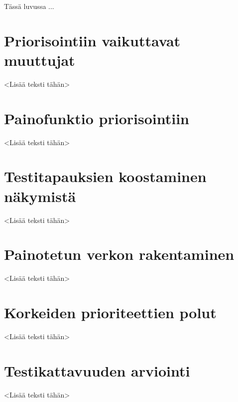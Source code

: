 Tässä luvussa ...

\section{Priorisointiin vaikuttavat muuttujat}

<Lisää teksti tähän>

\section{Painofunktio priorisointiin}

<Lisää teksti tähän>

\section{Testitapauksien koostaminen näkymistä}

<Lisää teksti tähän>

\section{Painotetun verkon rakentaminen}

<Lisää teksti tähän>

\section{Korkeiden prioriteettien polut}

<Lisää teksti tähän>

\section{Testikattavuuden arviointi}

<Lisää teksti tähän>
